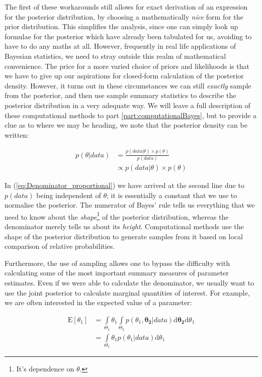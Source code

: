 \documentclass[11pt,fullpage]{book}
\begin{document}
The first of these workarounds still allows for exact derivation of an expression for the posterior distribution, by choosing a mathematically \textit{nice} form for the prior distribution. This simplifies the analysis, since one can simply look up formulae for the posterior which have already been tabulated for us, avoiding to have to do any maths at all. However, frequently in real life applications of Bayesian statistics, we need to stray outside this realm of mathematical convenience. The price for a more varied choice of priors and likelihoods is that we have to give up our aspirations for closed-form calculation of the posterior density. However, it turns out in these circumstances we can still \textit{exactly} sample from the posterior, and then use sample summary statistics to describe the posterior distribution in a very adequate way. We will leave a full description of these computational methods to part \ref{part:computationalBayes}, but to provide a clue as to where we may be heading, we note that the posterior density can be written:

\begin{equation}\label{eq:Denominator_proportional}
\begin{align}
p(\theta|data) &= \frac{p(data|\theta)\times p(\theta)}{p(data)}\\
&\propto p(data|\theta)\times p(\theta)
\end{align}
\end{equation}

In (\ref{eq:Denominator_proportional}) we have arrived at the second line due to $p(data)$ being independent of $\theta$; it is essentially a constant that we use to normalise the posterior. The numerator of Bayes' rule tells us everything that we need to know about the \textit{shape}\footnote{It's dependence on $\theta$.} of the posterior distribution, whereas the denominator merely tells us about its \textit{height}. Computational methods use the shape of the posterior distribution to generate samples from it based on local comparison of relative probabilities. 

Furthermore, the use of sampling allows one to bypass the difficulty with calculating some of the most important summary measures of parameter estimates. Even if we were able to calculate the denominator, we usually want to use the joint posterior to calculate marginal quantities of interest. For example, we are often interested in the expected value of a parameter:

\begin{equation}
\begin{align}
\mathrm{E}[\theta_1] &= \int\limits_{\Theta_1} \theta_1\int\limits_{\Theta_2} p(\theta_1,\boldsymbol{\theta_2}|data)\mathrm{d}\boldsymbol{\theta_2} \mathrm{d}\theta_1\\
&= \int\limits_{\Theta_1} \theta_1 p(\theta_1|data) \mathrm{d}\theta_1
\end{align}
\end{equation}
\end{document}
